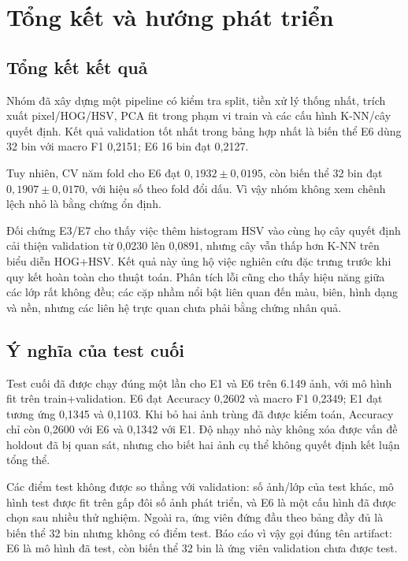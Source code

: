 \chapter{Tổng kết và hướng phát triển}
\section{Tổng kết kết quả}
Nhóm đã xây dựng một pipeline có kiểm tra split, tiền xử lý thống nhất, trích xuất pixel/HOG/HSV, PCA fit trong phạm vi train và các cấu hình K-NN/cây quyết định. Kết quả validation tốt nhất trong bảng hợp nhất là biến thể E6 dùng 32 bin với macro F1 0,2151; E6 16 bin đạt 0,2127.

Tuy nhiên, CV năm fold cho E6 đạt $0,1932\pm0,0195$, còn biến thể 32 bin đạt $0,1907\pm0,0170$, với hiệu số theo fold đổi dấu. Vì vậy nhóm không xem chênh lệch nhỏ là bằng chứng ổn định.

Đối chứng E3/E7 cho thấy việc thêm histogram HSV vào cùng họ cây quyết định cải thiện validation từ 0,0230 lên 0,0891, nhưng cây vẫn thấp hơn K-NN trên biểu diễn HOG+HSV. Kết quả này ủng hộ việc nghiên cứu đặc trưng trước khi quy kết hoàn toàn cho thuật toán. Phân tích lỗi cũng cho thấy hiệu năng giữa các lớp rất không đều; các cặp nhầm nổi bật liên quan đến màu, biên, hình dạng và nền, nhưng các liên hệ trực quan chưa phải bằng chứng nhân quả.

\section{Ý nghĩa của test cuối}
Test cuối đã được chạy đúng một lần cho E1 và E6 trên 6.149 ảnh, với mô hình fit trên train+validation. E6 đạt Accuracy 0,2602 và macro F1 0,2349; E1 đạt tương ứng 0,1345 và 0,1103. Khi bỏ hai ảnh trùng đã được kiểm toán, Accuracy chỉ còn 0,2600 với E6 và 0,1342 với E1. Độ nhạy nhỏ này không xóa được vấn đề holdout đã bị quan sát, nhưng cho biết hai ảnh cụ thể không quyết định kết luận tổng thể.

Các điểm test không được so thẳng với validation: số ảnh/lớp của test khác, mô hình test được fit trên gấp đôi số ảnh phát triển, và E6 là một cấu hình đã được chọn sau nhiều thử nghiệm. Ngoài ra, ứng viên đứng đầu theo bảng đầy đủ là biến thể 32 bin nhưng không có điểm test. Báo cáo vì vậy gọi đúng tên artifact: E6 là mô hình đã test, còn biến thể 32 bin là ứng viên validation chưa được test.

